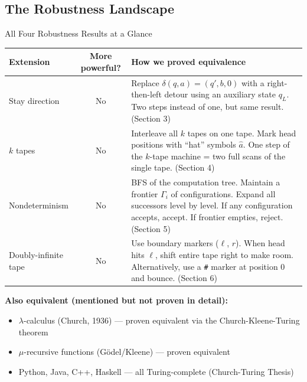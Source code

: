 \subsection{The Robustness Landscape}

\begin{conceptbox}{All Four Robustness Results at a Glance}
\begin{center}
\renewcommand{\arraystretch}{1.5}
\begin{tabular}{p{3.2cm}cp{8.5cm}}
\toprule
\textbf{Extension} & \textbf{More powerful?} & \textbf{How we proved equivalence} \\
\midrule
Stay direction & No & Replace $\delta(q,a) = (q',b,0)$ with a right-then-left detour using an auxiliary state $q_L$. Two steps instead of one, but same result. (Section 3) \\
$k$ tapes & No & Interleave all $k$ tapes on one tape. Mark head positions with ``hat'' symbols $\hat{a}$. One step of the $k$-tape machine = two full scans of the single tape. (Section 4) \\
Nondeterminism & No & BFS of the computation tree. Maintain a frontier $\Gamma_i$ of configurations. Expand all successors level by level. If any configuration accepts, accept. If frontier empties, reject. (Section 5) \\
Doubly-infinite tape & No & Use boundary markers ($\ell$, $r$). When head hits $\ell$, shift entire tape right to make room. Alternatively, use a \texttt{\#} marker at position 0 and bounce. (Section 6) \\
\bottomrule
\end{tabular}
\end{center}

\textbf{Also equivalent (mentioned but not proven in detail):}
\begin{itemize}[nosep]
\item $\lambda$-calculus (Church, 1936) --- proven equivalent via the Church-Kleene-Turing theorem
\item $\mu$-recursive functions (G\"odel/Kleene) --- proven equivalent
\item Python, Java, C++, Haskell --- all Turing-complete (Church-Turing Thesis)
\end{itemize}

\end{conceptbox}

